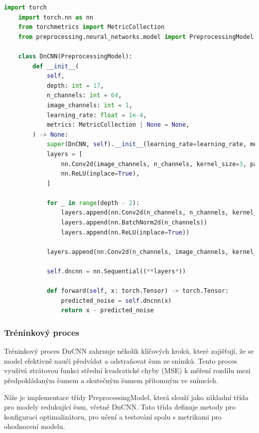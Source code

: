 \documentclass[male,czech,api_ing]{thesis}
\begin{document}
\begin{lstlisting}[language=Python, caption={Implementace konvoluční neuronové sítě pro redukci šumu}, label={lst:DnCNN}]
    import torch
    import torch.nn as nn
    from torchmetrics import MetricCollection
    from preprocessing.neural_networks.model import PreprocessingModel
    
    class DnCNN(PreprocessingModel):
        def __init__(
            self,
            depth: int = 17,
            n_channels: int = 64,
            image_channels: int = 1,
            learning_rate: float = 1e-4,
            metrics: MetricCollection | None = None,
        ) -> None:
            super(DnCNN, self).__init__(learning_rate=learning_rate, metrics=metrics)
            layers = [
                nn.Conv2d(image_channels, n_channels, kernel_size=3, padding=1),
                nn.ReLU(inplace=True),
            ]
    
            for _ in range(depth - 2):
                layers.append(nn.Conv2d(n_channels, n_channels, kernel_size=3, padding=1))
                layers.append(nn.BatchNorm2d(n_channels))
                layers.append(nn.ReLU(inplace=True))
    
            layers.append(nn.Conv2d(n_channels, image_channels, kernel_size=3, padding=1))
    
            self.dncnn = nn.Sequential((**layers*))
    
            def forward(self, x: torch.Tensor) -> torch.Tensor:
                predicted_noise = self.dncnn(x)
                return x - predicted_noise
\end{lstlisting}

\subsubsection{Tréninkový proces}
Tréninkový proces DnCNN zahrnuje několik klíčových kroků, které zajišťují, že se model efektivně naučí předvídat a odstraňovat šum ze snímků. Tento proces využívá ztrátovou funkci střední kvadratické chyby (MSE) k měření rozdílu mezi předpokládaným šumem a skutečným šumem přítomným ve snímcích.

Níže je implementace třídy PreprocessingModel, která slouží jako základní třída pro modely redukující šum, včetně DnCNN. Tato třída definuje metody pro konfiguraci optimalizátoru, pro učení a testování spolu s metrikami pro ohodnocení modelu.
\end{document}
